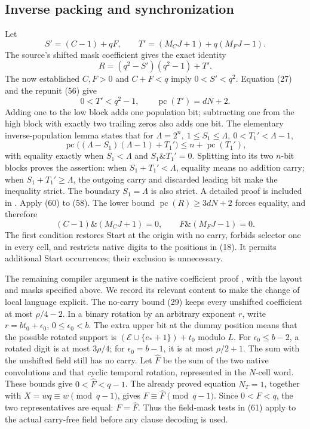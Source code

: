 \documentclass[11pt,a4paper]{article}
\theoremstyle{definition}
\theoremstyle{remark}
\newcommand{\pc}{\operatorname{pc}}
\newcommand{\band}{\mathbin{\&}}
\begin{document}
\subsection{Inverse packing and synchronization}
Let
\[
 S'=(C-1)+qF,\qquad
 T'=(M_CJ+1)+q(M_FJ-1). \tag{57}
\]
The source's shifted mask coefficient gives the exact identity
\[
 R=(q^2-S')(q^2-1)+T'. \tag{58}
\]
The now established \(C,F>0\) and \(C+F<q\) imply \(0<S'<q^2\).
Equation (27) and the repunit (56) give
\[
 0<T'<q^2-1,\qquad\pc(T')=dN+2. \tag{59}
\]
Adding one to the low block adds one population bit; subtracting
one from the high block with exactly two trailing zeros also adds
one bit.
The elementary inverse-population lemma states that for
\(\Lambda=2^n,\ 1\le S_1\le\Lambda,\ 0<T_1'<\Lambda-1\),
\[
 \pc\bigl((\Lambda-S_1)(\Lambda-1)+T_1'\bigr)\le n+\pc(T_1'),
 \tag{60}
\]
with equality exactly when \(S_1<\Lambda\) and
\(S_1\band T_1'=0\).
Splitting into its two \(n\)-bit blocks proves the assertion:
when \(S_1+T_1'<\Lambda\), equality means no addition carry; when
\(S_1+T_1'\ge\Lambda\), the outgoing carry and discarded leading bit
make the inequality strict. The boundary \(S_1=\Lambda\) is also
strict. A detailed proof is included in \cite{compiler75}.
Apply (60) to (58). The lower bound \(\pc(R)\ge3dN+2\)
forces equality, and therefore
\[
 (C-1)\band(M_CJ+1)=0,\qquad
 F\band(M_FJ-1)=0. \tag{61}\label{eq:typed}
\]
The first condition restores Start at the origin with no carry,
forbids selector one in every cell, and restricts native digits to
the positions in (18). It permits additional Start occurrences;
their exclusion is unnecessary.

The remaining compiler argument is the native coefficient proof
\cite{compiler76,compiler75}, with the layout and masks specified
above. We record its relevant content to make the change of local
language explicit. The no-carry bound (29) keeps every unshifted
coefficient at most \(\rho/4-2\).
In a binary rotation by an arbitrary exponent \(r\), write
\(r=bt_0+\epsilon_0\), \(0\le\epsilon_0<b\).
The extra upper bit at the dummy position means that the possible
rotated support is
\((\mathcal E\cup\{e_*+1\})+t_0\) modulo \(L\).
For \(\epsilon_0\le b-2\), a rotated digit is at most \(3\rho/4\);
for \(\epsilon_0=b-1\), it is at most \(\rho/2+1\).
The sum with the unshifted field still has no carry.
Let \(\widehat F\) be the sum of the two native convolutions
and that cyclic temporal rotation, represented in the \(N\)-cell
word. These bounds give \(0<\widehat F<q-1\).
The already proved equation \(N_T=1\), together with
\(X=wq\equiv w\pmod{q-1}\), gives
\(F\equiv\widehat F\pmod{q-1}\).
Since \(0<F<q\), the two representatives are equal:
\(F=\widehat F\). Thus the field-mask tests in (61) apply to the
actual carry-free field before any clause decoding is used.
\end{document}
